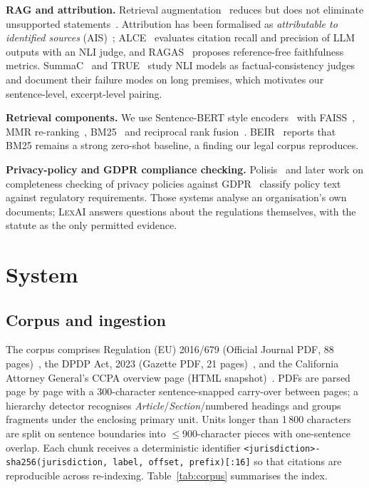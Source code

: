 \documentclass[conference]{IEEEtran}
\newcommand{\sys}{\textsc{LexAI}}
\begin{document}
\textbf{RAG and attribution.} Retrieval augmentation~\cite{lewis2020rag} reduces but does not eliminate unsupported statements~\cite{shuster2021retrieval}. Attribution has been formalised as \emph{attributable to identified sources} (AIS)~\cite{rashkin2023ais}; ALCE~\cite{gao2023alce} evaluates citation recall and precision of LLM outputs with an NLI judge, and RAGAS~\cite{es2024ragas} proposes reference-free faithfulness metrics. SummaC~\cite{laban2022summac} and TRUE~\cite{honovich2022true} study NLI models as factual-consistency judges and document their failure modes on long premises, which motivates our sentence-level, excerpt-level pairing.

\textbf{Retrieval components.} We use Sentence-BERT style encoders~\cite{reimers2019sbert} with FAISS~\cite{johnson2019faiss}, MMR re-ranking~\cite{carbonell1998mmr}, BM25~\cite{robertson2009bm25} and reciprocal rank fusion~\cite{cormack2009rrf}. BEIR~\cite{thakur2021beir} reports that BM25 remains a strong zero-shot baseline, a finding our legal corpus reproduces.

\textbf{Privacy-policy and GDPR compliance checking.} Polisis~\cite{harkous2018polisis} and later work on completeness checking of privacy policies against GDPR~\cite{amaral2021completeness} classify policy text against regulatory requirements. Those systems analyse an organisation's own documents; \sys{} answers questions about the regulations themselves, with the statute as the only permitted evidence.

\section{System}
\label{sec:system}

\subsection{Corpus and ingestion}
The corpus comprises Regulation (EU) 2016/679 (Official Journal PDF, 88 pages)~\cite{gdpr2016}, the DPDP Act, 2023 (Gazette PDF, 21 pages)~\cite{dpdp2023}, and the California Attorney General's CCPA overview page (HTML snapshot)~\cite{ccpa2018}. PDFs are parsed page by page with a 300-character sentence-snapped carry-over between pages; a hierarchy detector recognises \emph{Article}/\emph{Section}/numbered headings and groups fragments under the enclosing primary unit. Units longer than 1\,800 characters are split on sentence boundaries into $\le$900-character pieces with one-sentence overlap. Each chunk receives a deterministic identifier \texttt{<jurisdiction>-sha256(jurisdiction, label, offset, prefix)[:16]} so that citations are reproducible across re-indexing. Table~\ref{tab:corpus} summarises the index.
\end{document}
